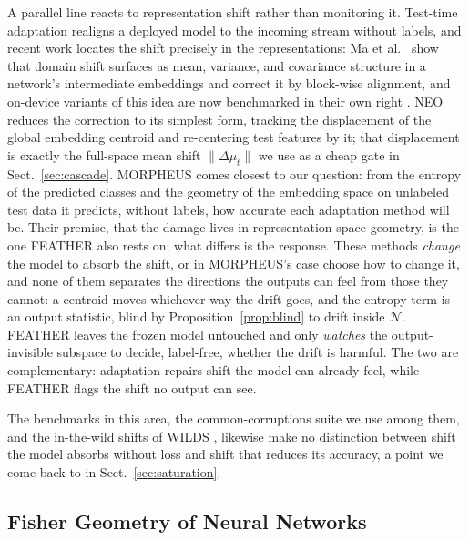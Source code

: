 \documentclass[graybox]{SNmult}
\begin{document}
A parallel line reacts to representation shift rather than monitoring it.
Test-time adaptation realigns a deployed model to the incoming stream without
labels, and recent work locates the shift precisely in the representations: Ma
et al.\ \cite{ma2026pea} show that domain shift surfaces as mean, variance, and
covariance structure in a network's intermediate embeddings and correct it by
block-wise alignment, and on-device variants of this idea are now benchmarked
in their own right \cite{danilowski2026botta}. NEO \cite{murphy2026neo} reduces
the correction to its simplest form, tracking the displacement of the global
embedding centroid and re-centering test features by it; that displacement is
exactly the full-space mean shift $\lVert\Delta\mu_t\rVert$ we use as a cheap
gate in Sect.~\ref{sec:cascade}. MORPHEUS \cite{danilowski2026morpheus} comes
closest to our question: from the entropy of the predicted classes and the
geometry of the embedding space on unlabeled test data it predicts, without
labels, how accurate each adaptation method will be. Their premise, that the damage
lives in representation-space geometry, is the one FEATHER also rests on; what
differs is the response. These methods \emph{change} the model to absorb the
shift, or in MORPHEUS's case choose how to change it, and none of them separates
the directions the outputs can feel from those they cannot: a centroid moves
whichever way the drift goes, and the entropy term is an output statistic, blind
by Proposition~\ref{prop:blind} to drift inside $\mathcal{N}$. FEATHER leaves the frozen model
untouched and only \emph{watches} the output-invisible subspace to decide,
label-free, whether the drift is harmful. The two are complementary: adaptation
repairs shift the model can already feel, while FEATHER flags the shift no
output can see.

The benchmarks in this
area, the common-corruptions suite \cite{hendrycks2019benchmarking} we use
among them, and the in-the-wild shifts of WILDS \cite{koh2021wilds}, likewise
make no distinction between shift the model absorbs without loss and shift that
reduces its accuracy, a point we come back to in Sect.~\ref{sec:saturation}.

\subsection{Fisher Geometry of Neural Networks}
\end{document}
